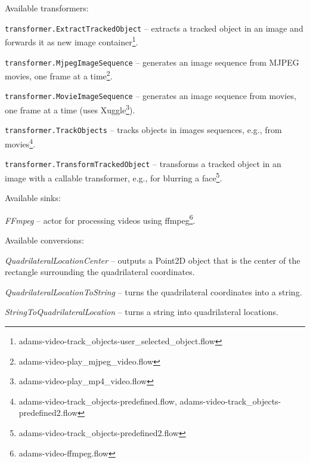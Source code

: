 \documentclass[a4paper]{book}
\begin{document}
\noindent Available transformers:
\begin{tight_itemize}
	\item \texttt{transformer.ExtractTrackedObject} -- extracts a tracked
	object in an image and forwards it as new image
	container\footnote{adams-video-track\_objects-user\_selected\_object.flow}.
	\item \texttt{transformer.MjpegImageSequence} -- generates an image sequence
	from MJPEG movies, one frame at a time\footnote{adams-video-play\_mjpeg\_video.flow}.
	\item \texttt{transformer.MovieImageSequence} -- generates an image sequence
	from movies, one frame at a time (uses Xuggle\cite{xuggle}\footnote{adams-video-play\_mp4\_video.flow}).
	\item \texttt{transformer.TrackObjects} -- tracks objects in images sequences,
	e.g., from movies\footnote{adams-video-track\_objects-predefined.flow, adams-video-track\_objects-predefined2.flow}.
	\item \texttt{transformer.TransformTrackedObject} -- transforms a tracked
	object in an image with a callable transformer, e.g., for blurring a
	face\footnote{adams-video-track\_objects-predefined2.flow}.
\end{tight_itemize}

\noindent Available sinks:
\begin{tight_itemize}
  \item \textit{FFmpeg} -- actor for processing videos using
  ffmpeg\cite{ffmpeg}\footnote{adams-video-ffmpeg.flow}.
\end{tight_itemize}

\noindent Available conversions:
\begin{tight_itemize}
  \item \textit{QuadrilateralLocationCenter} -- outputs a Point2D object that
  is the center of the rectangle surrounding the quadrilateral coordinates.
  \item \textit{QuadrilateralLocationToString} -- turns the quadrilateral
  coordinates into a string.
  \item \textit{StringToQuadrilateralLocation} -- turns a string into quadrilateral
  locations.
\end{tight_itemize}



\end{document}
